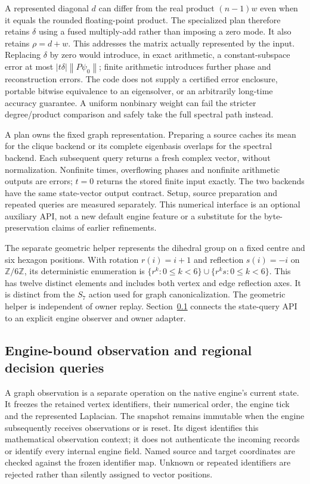 \documentclass[11pt,a4paper]{article}
\theoremstyle{definition}\newtheorem{definition}[theorem]{Definition}
\newcommand{\norm}[1]{\left\lVert#1\right\rVert}
\begin{document}
A represented diagonal $d$ can differ from the real product $(n-1)w$ even when
it equals the rounded floating-point product. The specialized plan therefore
retains $\delta$ using a fused multiply-add rather than imposing a zero mode.
It also retains $\rho=d+w$. This addresses the matrix actually represented by
the input. Replacing $\delta$ by zero would introduce, in exact arithmetic,
a constant-subspace error at most $|t\delta|\norm{P\psi_0}$; finite arithmetic
introduces further phase and reconstruction errors. The code does not supply
a certified error enclosure, portable bitwise equivalence to an eigensolver,
or an arbitrarily long-time accuracy guarantee. A uniform nonbinary weight
can fail the stricter degree/product comparison and safely take the full
spectral path instead.

A plan owns the fixed graph representation. Preparing a source caches its
mean for the clique backend or its complete eigenbasis overlaps for the
spectral backend. Each subsequent query returns a fresh complex vector,
without normalization. Nonfinite times, overflowing phases and nonfinite
arithmetic outputs are errors; $t=0$ returns the stored finite input exactly.
The two backends have the same state-vector output contract. Setup, source
preparation and repeated queries are measured separately. This numerical
interface is an optional auxiliary API, not a new default engine feature or a
substitute for the byte-preservation claims of earlier refinements.

The separate geometric helper represents the dihedral group on a fixed centre
and six hexagon positions. With rotation $r(i)=i+1$ and reflection $s(i)=-i$
on $\mathbb Z/6\mathbb Z$, its deterministic enumeration is
$\{r^k:0\leq k<6\}\cup\{r^ks:0\leq k<6\}$. This has twelve distinct
elements and includes both vertex and edge reflection axes. It is distinct
from the $S_7$ action used for graph canonicalization. The geometric helper is independent of owner replay. Section~\ref{sec:engineobserver} connects the state-query API to an explicit engine observer and owner adapter.

\subsection{Engine-bound observation and regional decision queries}
\label{sec:engineobserver}
A graph observation is a separate operation on the native engine's current
state. It freezes the retained vertex identifiers, their numerical order, the
engine tick and the represented Laplacian. The snapshot remains immutable when
the engine subsequently receives observations or is reset. Its digest identifies
this mathematical observation context; it does not authenticate the incoming
records or identify every internal engine field. Named source and target
coordinates are checked against the frozen identifier map. Unknown or repeated
identifiers are rejected rather than silently assigned to vector positions.
\end{document}
